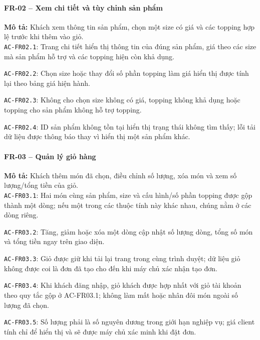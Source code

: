 \paragraph{FR-02 -- Xem chi tiết và tùy chỉnh sản phẩm}
\textbf{Mô tả:} Khách xem thông tin sản phẩm, chọn một size có giá và các topping hợp lệ trước khi thêm vào giỏ.\\
\noindent\texttt{AC-FR02.1}: Trang chi tiết hiển thị thông tin của đúng sản phẩm, giá theo các size mà sản phẩm hỗ trợ và các topping hiện còn khả dụng.\par
\noindent\texttt{AC-FR02.2}: Chọn size hoặc thay đổi số phần topping làm giá hiển thị được tính lại theo bảng giá hiện hành.\par
\noindent\texttt{AC-FR02.3}: Không cho chọn size không có giá, topping không khả dụng hoặc topping cho sản phẩm không hỗ trợ topping.\par
\noindent\texttt{AC-FR02.4}: ID sản phẩm không tồn tại hiển thị trạng thái không tìm thấy; lỗi tải dữ liệu được thông báo thay vì hiển thị một sản phẩm khác.\par

\paragraph{FR-03 -- Quản lý giỏ hàng}
\textbf{Mô tả:} Khách thêm món đã chọn, điều chỉnh số lượng, xóa món và xem số lượng/tổng tiền của giỏ.\\
\noindent\texttt{AC-FR03.1}: Hai món cùng sản phẩm, size và cấu hình/số phần topping được gộp thành một dòng; nếu một trong các thuộc tính này khác nhau, chúng nằm ở các dòng riêng.\par
\noindent\texttt{AC-FR03.2}: Tăng, giảm hoặc xóa một dòng cập nhật số lượng dòng, tổng số món và tổng tiền ngay trên giao diện.\par
\noindent\texttt{AC-FR03.3}: Giỏ được giữ khi tải lại trang trong cùng trình duyệt; dữ liệu giỏ không được coi là đơn đã tạo cho đến khi máy chủ xác nhận tạo đơn.\par
\noindent\texttt{AC-FR03.4}: Khi khách đăng nhập, giỏ khách được hợp nhất với giỏ tài khoản theo quy tắc gộp ở AC-FR03.1; không làm mất hoặc nhân đôi món ngoài số lượng đã chọn.\par
\noindent\texttt{AC-FR03.5}: Số lượng phải là số nguyên dương trong giới hạn nghiệp vụ; giá client tính chỉ để hiển thị và sẽ được máy chủ xác minh khi đặt đơn.\par

